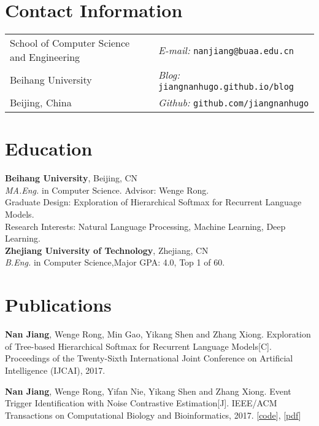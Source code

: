 \documentclass[margin,line]{resume}
\begin{document}

\begin{resume}
\section{Contact Information}
\begin{tabular}{@{}p{3in}p{3in}}
School of Computer Science and Engineering & {\it E-mail:}  {\tt nanjiang@buaa.edu.cn} \\
Beihang University                         & {\it Blog:} {\tt jiangnanhugo.github.io/blog} \\
Beijing, China                             & {\it Github:} {\tt github.com/jiangnanhugo} \\
\end{tabular}


\section{Education}
{\bf Beihang University}, Beijing,  CN\\
\emph{MA.Eng.} in Computer Science. Advisor: Wenge Rong.\\
Graduate Design: Exploration of Hierarchical Softmax for Recurrent Language Models. \\
Research Interests: Natural Language Processing, Machine Learning, Deep Learning. \\

{\bf Zhejiang University of Technology}, Zhejiang, CN\\
\emph{B.Eng.} in Computer Science,\space Major GPA: 4.0, Top 1 of 60.


\section{Publications}

\textbf{Nan Jiang}, Wenge Rong, Min Gao, Yikang Shen and Zhang Xiong. Exploration of Tree-based Hierarchical Softmax for Recurrent Language Models[C]. Proceedings of the Twenty-Sixth International Joint Conference on Artificial Intelligence (IJCAI), 2017.

\textbf{Nan Jiang}, Wenge Rong, Yifan Nie, Yikang Shen and Zhang Xiong. Event Trigger Identification with Noise Contrastive Estimation[J]. IEEE/ACM Transactions on Computational Biology and Bioinformatics, 2017. [\href{https://github.com/jiangnanHugo/mlee-nce}{code}], [\href{https://github.com/jiangnanhugo/paper/blob/master/APBC2017/APBC2017.pdf}{pdf}]


\end{resume}
\end{document}
